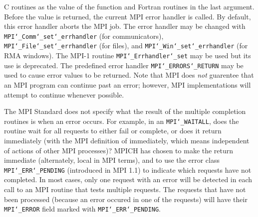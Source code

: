 C routines as the value of the function and Fortran routines in the last
argument.  Before the value is returned, the current MPI error handler is
called.  By default, this error handler aborts the MPI job.  The error handler
may be changed with {\tt MPI{\tt \char`\_}Comm{\tt \char`\_}set{\tt \char`\_}errhandler} (for communicators),
{\tt MPI{\tt \char`\_}File{\tt \char`\_}set{\tt \char`\_}errhandler} (for files), and {\tt MPI{\tt \char`\_}Win{\tt \char`\_}set{\tt \char`\_}errhandler} (for
RMA windows).  The MPI-1 routine {\tt MPI{\tt \char`\_}Errhandler{\tt \char`\_}set} may be used but
its use is deprecated.  The predefined error handler
{\tt MPI{\tt \char`\_}ERRORS{\tt \char`\_}RETURN} may be used to cause error values to be returned.
Note that MPI does {\em not} guarentee that an MPI program can continue past
an error; however, MPI implementations will attempt to continue whenever
possible.
\par
{}
The MPI Standard does not specify what the result of the multiple
completion routines is when an error occurs.  For example, in an
{\tt MPI{\tt \char`\_}WAITALL}, does the routine wait for all requests to either fail or
complete, or does it return immediately (with the MPI definition of
immediately, which means independent of actions of other MPI processes)?
MPICH has chosen to make the return immediate (alternately, local in MPI
terms), and to use the error class {\tt MPI{\tt \char`\_}ERR{\tt \char`\_}PENDING} (introduced in MPI 1.1)
to indicate which requests have not completed.  In most cases, only
one request with an error will be detected in each call to an MPI routine
that tests multiple requests.  The requests that have not been processed
(because an error occured in one of the requests) will have their
{\tt MPI{\tt \char`\_}ERROR} field marked with {\tt MPI{\tt \char`\_}ERR{\tt \char`\_}PENDING}.
\endmanpage
